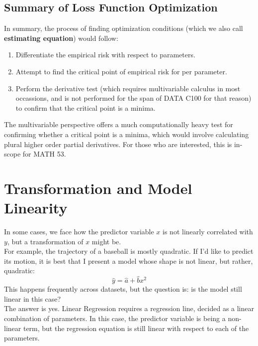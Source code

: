 \subsection{Summary of Loss Function Optimization}
In summary, the process of finding optimization conditions (which we also call \textbf{estimating equation}) would follow:
\begin{enumerate}
    \item Differentiate the empirical risk with respect to parameters.
    \item Attempt to find the critical point of empirical risk for per parameter.
    \item Perform the derivative test (which requires multivariable calculus in most occassions, and is not performed for the span of DATA C100 for that reason) to confirm that the critical point is a minima.
\end{enumerate}
The multivariable perspective offers a much computationally heavy test for confirming whether a critical point is a minima, which would involve calculating plural higher order partial derivatives. For those who are interested, this is in-scope for MATH 53.

\section{Transformation and Model Linearity}
In some cases, we face how the predictor variable $x$ is not linearly correlated with $y$, but a transformation of $x$ might be. \\
For example, the trajectory of a baseball is mostly quadratic. If I'd like to predict its motion, it is best that I present a model whose shape is not linear, but rather, quadratic:
\[\hat{y} = \hat{a} + \hat{b} x^2 \]
This happens frequently across datasets, but the question is: is the model still linear in this case? \\
The answer is yes. Linear Regression requires a regression line, decided as a linear combination of parameters. In this case, the predictor variable is being a non-linear term, but the regression equation is still linear with respect to each of the parameters.

